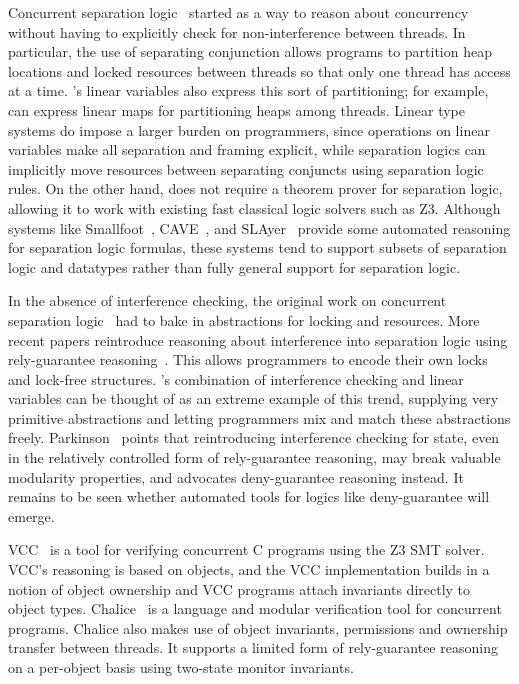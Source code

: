 Concurrent separation logic~\cite{OHearn07} started as a way to reason about concurrency without having to explicitly check for non-interference between threads.
In particular, the use of separating conjunction allows programs to partition heap locations and locked resources between threads so that only one thread has access at a time.
\civl's linear variables also express this sort of partitioning; for example, \civl can express linear maps for partitioning heaps among threads.
Linear type systems do impose a larger burden on programmers, since operations on linear variables make all separation and framing explicit, while separation logics can implicitly move resources between separating conjuncts using separation logic rules.
On the other hand, \civl does not require a theorem prover for separation logic, allowing it to work with existing fast classical logic solvers such as Z3.
Although systems like Smallfoot~\cite{Smallfoot}, CAVE~\cite{Cave}, and SLAyer~\cite{Slayer} provide some automated reasoning for separation logic formulas, these systems tend to support subsets of separation logic and datatypes rather than fully general support for separation logic.

In the absence of interference checking, the original work on concurrent separation logic~\cite{OHearn07} had to bake in abstractions for locking and resources.
More recent papers reintroduce reasoning about interference into separation logic using rely-guarantee reasoning~\cite{SAGL,RGSep}.
This allows programmers to encode their own locks and lock-free structures.
\civl's combination of interference checking and linear variables can be thought of as an extreme example of this trend, supplying very primitive abstractions and letting programmers mix and match these abstractions freely.
Parkinson~\cite{SepLog700} points that reintroducing interference checking for state, even in the relatively controlled form of rely-guarantee reasoning, may break valuable modularity properties, and advocates deny-guarantee reasoning instead.
It remains to be seen whether automated tools for logics like deny-guarantee will emerge.

VCC~\cite{VCC} is a tool for verifying concurrent C programs using the Z3 SMT solver.  VCC's reasoning is based on objects, and the VCC implementation builds in a notion of object ownership and VCC programs attach invariants directly to object types.  Chalice~\cite{LM09} is a language and modular verification tool for concurrent programs. Chalice also makes use of  object invariants, permissions and ownership transfer between threads. It supports a limited form of rely-guarantee reasoning on a per-object basis using two-state monitor invariants.

